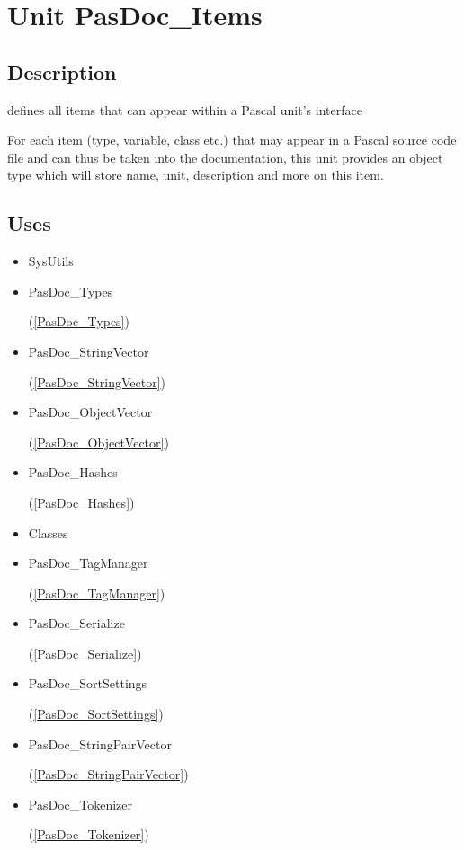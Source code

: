 \documentclass{report}
\begin{document}
\chapter{Unit PasDoc{\_}Items}
\label{PasDoc_Items}
\section{Description}
defines all items that can appear within a Pascal unit's interface\hfill\vspace*{1ex}

        

For each item (type, variable, class etc.) that may appear in a Pascal source code file and can thus be taken into the documentation, this unit provides an object type which will store name, unit, description and more on this item.
\section{Uses}
\begin{itemize}
\item \begin{ttfamily}SysUtils\end{ttfamily}\item \begin{ttfamily}PasDoc{\_}Types\end{ttfamily}(\ref{PasDoc_Types})\item \begin{ttfamily}PasDoc{\_}StringVector\end{ttfamily}(\ref{PasDoc_StringVector})\item \begin{ttfamily}PasDoc{\_}ObjectVector\end{ttfamily}(\ref{PasDoc_ObjectVector})\item \begin{ttfamily}PasDoc{\_}Hashes\end{ttfamily}(\ref{PasDoc_Hashes})\item \begin{ttfamily}Classes\end{ttfamily}\item \begin{ttfamily}PasDoc{\_}TagManager\end{ttfamily}(\ref{PasDoc_TagManager})\item \begin{ttfamily}PasDoc{\_}Serialize\end{ttfamily}(\ref{PasDoc_Serialize})\item \begin{ttfamily}PasDoc{\_}SortSettings\end{ttfamily}(\ref{PasDoc_SortSettings})\item \begin{ttfamily}PasDoc{\_}StringPairVector\end{ttfamily}(\ref{PasDoc_StringPairVector})\item \begin{ttfamily}PasDoc{\_}Tokenizer\end{ttfamily}(\ref{PasDoc_Tokenizer})\end{itemize}
\end{document}
